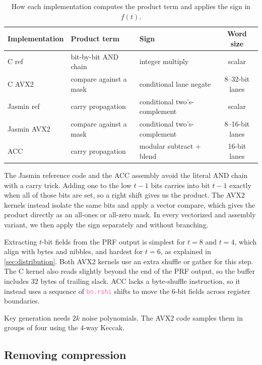 \begin{table}[h]
  \centering
  \caption{How each implementation computes the product term and applies the
           sign in $f(t)$.}
  \label{tab:sampler-variants}
  \small
  \begin{tabular}{lllc}
    \toprule
    Implementation & Product term & Sign & Word size \\
    \midrule
    C ref       & bit-by-bit AND chain   & integer multiply             & scalar \\
    C AVX2      & compare against a mask & conditional lane negate      & 8--32-bit lanes \\
    Jasmin ref  & carry propagation      & conditional two's-complement & scalar \\
    Jasmin AVX2 & compare against a mask & conditional two's-complement & 8--16-bit lanes \\
    ACC         & carry propagation      & modular subtract + blend      & 16-bit lanes \\
    \bottomrule
  \end{tabular}
\end{table}

The Jasmin reference code and the ACC assembly avoid the literal AND chain
with a carry trick. Adding one to the low $t-1$ bits carries into bit $t-1$
exactly when all of those bits are set, so a right shift gives us the product.
The AVX2 kernels instead isolate the same bits and apply a vector compare,
which gives the product directly as an all-ones or all-zero mask. In every
vectorized and assembly variant, we then apply the sign separately and
without branching.

Extracting $t$-bit fields from the PRF output is simplest for $t=8$ and $t=4$,
which align with bytes and nibbles, and hardest for $t=6$, as explained in \cref{sec:distribution}. Both AVX2 kernels use an extra 
shuffle or gather for this step. The C kernel also reads slightly beyond the end of the PRF output, so the buffer includes 32 bytes of 
trailing slack. ACC lacks a byte-shuffle instruction, so it instead uses a sequence of \textcolor{hotpink}{\texttt{bn.rshi}} shifts to
move the 6-bit fields across register boundaries.

Key generation needs $2k$ noise polynomials. The AVX2 code samples them in
groups of four using the $4$-way Keccak.

\subsection{Removing compression}
\label{sec:impl:compression}

